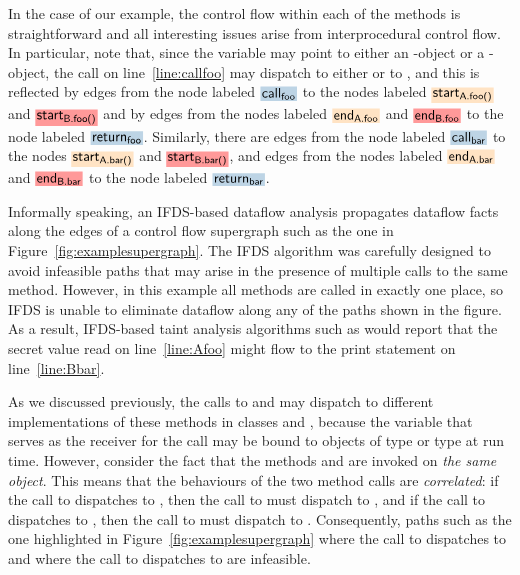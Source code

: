 In the case of our example, the control flow within each of the methods is straightforward and
all interesting issues arise from interprocedural control flow. In particular,
note that, since the variable  may point to either an -object or a -object, 
the call on line~\ref{line:callfoo} may dispatch to either  or to ,
and this is reflected by edges  
  from the node labeled $\highlight{\code{call}_\code{foo}}{greyblue}$ to the nodes labeled
  $\highlight{\code{start}_\code{A.foo()}}{bisque}$ and $\highlight{\code{start}_\code{B.foo()}}{lightsalmonpink}$
and by edges
  from the nodes labeled $\highlight{\code{end}_\code{A.foo}}{bisque}$ and $\highlight{\code{end}_\code{B.foo}}{lightsalmonpink}$ 
  to the node labeled  $\highlight{\code{return}_\code{foo}}{greyblue}$.  
Similarly, there are edges from the node labeled $\highlight{\code{call}_\code{bar}}{greyblue}$ to the nodes 
$\highlight{\code{start}_\code{A.bar()}}{bisque}$ and $\highlight{\code{start}_\code{B.bar()}}{lightsalmonpink}$, and 
edges
  from the nodes labeled $\highlight{\code{end}_\code{A.bar}}{bisque}$ and $\highlight{\code{end}_\code{B.bar}}{lightsalmonpink}$ 
  to the node labeled  $\highlight{\code{return}_\code{bar}}{greyblue}$. 
 
Informally speaking, an IFDS-based dataflow analysis propagates dataflow facts along the edges
of a control flow supergraph such as the one in Figure~\ref{fig:examplesupergraph}. The
IFDS algorithm was carefully designed to avoid infeasible paths that may arise in the
presence of multiple calls to the same method. However, in this example all methods are
called in exactly one place, so IFDS is unable to eliminate dataflow along any of the
paths shown in the figure. As a result, IFDS-based taint analysis algorithms such as
\cite{DBLP:conf/issta/GuarnieriPTDTB11,DBLP:conf/pldi/ArztRFBBKTOM14} would report 
that the secret value read on line~\ref{line:Afoo}
might flow to the print statement on line~\ref{line:Bbar}. 

As we discussed previously, the calls to  and  may dispatch
to different implementations of these methods in classes  and , 
because the variable  that serves as the receiver for the call may be bound to
 objects of type  or type  at run time. 
However, consider the fact that the methods  and  are invoked
on \textit{the same object}. This means that the behaviours of the two method calls
are \textit{correlated}: if the call to  dispatches to ,
then the call to  must dispatch to , and if the call
to  dispatches to , then the call to  must 
dispatch to .  Consequently, paths such as the one highlighted in
Figure~\ref{fig:examplesupergraph} where the call to  dispatches 
to  and where the call to  dispatches to 
are infeasible.  

